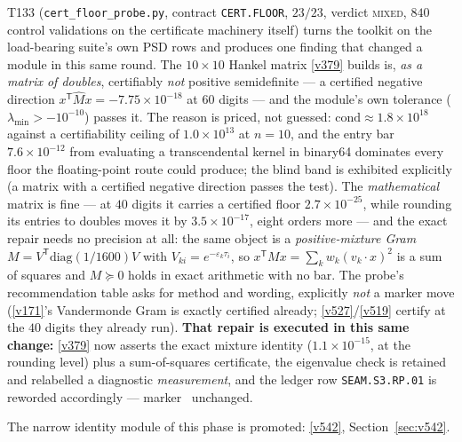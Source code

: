 \documentclass[11pt,a4paper]{article}
\begin{document}
\noindent T133 (\texttt{cert\_floor\_probe.py}, contract \texttt{CERT.FLOOR}, $23/23$,
verdict \textsc{mixed}, $840$ control validations on the certificate machinery itself) turns
the toolkit on the load-bearing suite's own PSD rows and produces one finding that changed a
module in this same round. The $10\times10$ Hankel matrix \vref{v379} builds is, \emph{as a
matrix of doubles}, certifiably \emph{not} positive semidefinite --- a certified negative
direction $x^{\mathsf T}\widehat Mx=-7.75\times10^{-18}$ at $60$ digits --- and the module's
own tolerance ($\lambda_{\min}>-10^{-10}$) passes it. The reason is priced, not guessed:
$\mathrm{cond}\approx1.8\times10^{18}$ against a certifiability ceiling of
$1.0\times10^{13}$ at $n=10$, and the entry bar $7.6\times10^{-12}$ from evaluating a
transcendental kernel in binary64 dominates every floor the floating-point route could
produce; the blind band is exhibited explicitly (a matrix with a certified negative
direction passes the test). The \emph{mathematical} matrix is fine --- at $40$ digits it
carries a certified floor $2.7\times10^{-25}$, while rounding its entries to doubles moves
it by $3.5\times10^{-17}$, eight orders more --- and the exact repair needs no precision at
all: the same object is a \emph{positive-mixture Gram}
$M=V^{\mathsf T}\mathrm{diag}(1/1600)V$ with $V_{ki}=e^{-\varepsilon_k\tau_i}$, so
$x^{\mathsf T}Mx=\sum_kw_k(v_k\!\cdot\!x)^2$ is a sum of squares and $M\succeq0$ holds in
exact arithmetic with no bar. The probe's recommendation table asks for method and wording,
explicitly \emph{not} a marker move (\vref{v171}'s Vandermonde Gram is exactly certified
already; \vref{v527}/\vref{v519} certify at the $40$ digits they already run).
\textbf{That repair is executed in this same change:} \vref{v379} now asserts the exact
mixture identity ($1.1\times10^{-15}$, at the rounding level) plus a sum-of-squares
certificate, the eigenvalue check is retained and relabelled a diagnostic
\emph{measurement}, and the ledger row \texttt{SEAM.S3.RP.01} is reworded accordingly ---
marker \mE\ unchanged.

\noindent The narrow identity module of this phase is promoted: \vref{v542},
Section~\ref{sec:v542}.
\end{document}
